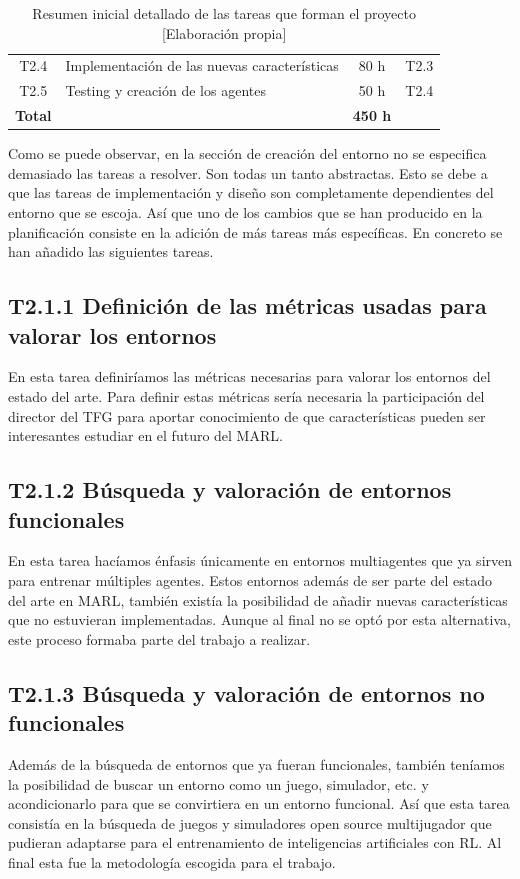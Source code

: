 \begin{table}[h]
\begin{center}
\begin{tabular}{| c | l | c | c |}
			T2.4            & Implementación de las nuevas características & 80 h            & T2.3                 \\
			T2.5            & Testing y creación de los agentes            & 50 h            & T2.4                 \\
			\hline
			\textbf{Total}  &                                              & \textbf{450 h}  &                      \\
			\hline
		\end{tabular}
		\caption{Resumen inicial detallado de las tareas que forman el proyecto [Elaboración propia]}
		\label{tab:planificacion}
	\end{center}
\end{table}

Como se puede observar, en la sección de creación del entorno no se especifica demasiado las tareas a resolver. Son todas un tanto abstractas. Esto se debe a que las tareas de implementación y diseño son completamente dependientes del entorno que se escoja. Así que uno de los cambios que se han producido en la planificación consiste en la adición de más tareas más específicas. En concreto se han añadido las siguientes tareas.  

\subsection*{T2.1.1 Definición de las métricas usadas para valorar los entornos}
En esta tarea definiríamos las métricas necesarias para valorar los entornos del estado del arte. Para definir estas métricas sería necesaria la participación del director del TFG para aportar conocimiento de que características pueden ser interesantes estudiar en el futuro del MARL.

\subsection*{T2.1.2 Búsqueda y valoración de entornos funcionales}
En esta tarea hacíamos énfasis únicamente en entornos multiagentes que ya sirven para entrenar múltiples agentes. Estos entornos además de ser parte del estado del arte en MARL, también existía la posibilidad de añadir nuevas características que no estuvieran implementadas. Aunque al final no se optó por esta alternativa, este proceso formaba parte del trabajo a realizar.

\subsection*{T2.1.3 Búsqueda y valoración de entornos no funcionales}
Además de la búsqueda de entornos que ya fueran funcionales, también teníamos la posibilidad de buscar un entorno como un juego, simulador, etc. y acondicionarlo para que se convirtiera en un entorno funcional. Así que esta tarea consistía en la búsqueda de juegos y simuladores open source multijugador que pudieran adaptarse para el entrenamiento de inteligencias artificiales con RL. Al final esta fue la metodología escogida para el trabajo.

